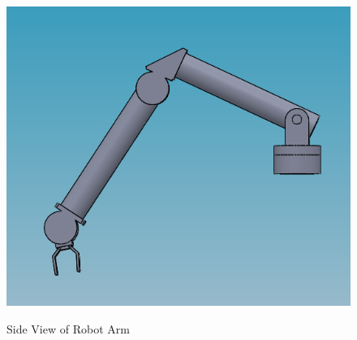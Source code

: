 \begin{figure}[htb]
	\centering
	\includegraphics[scale=0.70]{sections/robot-design/images/arm_side.png}
	\label{sample_return_rover:robot_design:arm_side.png}
	\caption{Side View of Robot Arm}
\end{figure}
